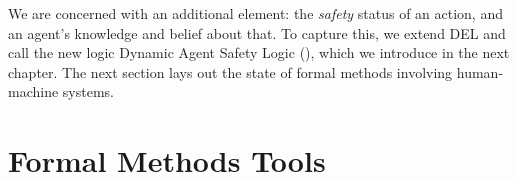 We are concerned with an additional element: the \emph{safety} status of an action, and an agent's knowledge and belief about that. To capture this, we extend DEL and call the new logic Dynamic Agent Safety Logic (\DASL), which we introduce in the next chapter. The next section lays out the state of formal methods involving human-machine systems.

\section{Formal Methods Tools}~\label{sec:fm}


